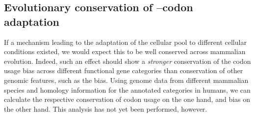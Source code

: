 \subsection{Evolutionary conservation of --codon adaptation}

If a mechanism leading to the adaptation of the cellular \trna pool to different
cellular conditions existed, we would expect this to be well conserved across
mammalian evolution. Indeed, such an effect should show a \emph{stronger}
conservation of the codon usage bias across different functional gene categories
than conservation of other genomic features, such as the \gc bias. Using genome
data from different mammalian species and homology information for the annotated
\go categories in humans, we can calculate the respective conservation of codon
usage on the one hand, and \gc bias on the other hand. This analysis has not yet
been performed, however.
